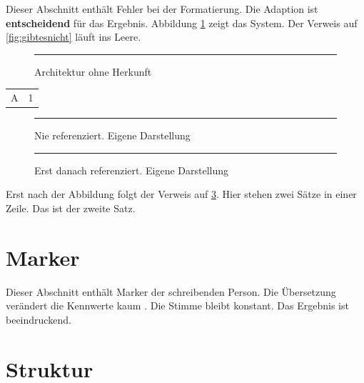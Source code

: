 Dieser Abschnitt enthält Fehler bei der Formatierung.
Die Adaption ist \textbf{entscheidend} für das Ergebnis. %
Abbildung \ref{fig:ohnequelle} zeigt das System. %
Der Verweis auf \cref{fig:gibtesnicht} läuft ins Leere. %

\begin{figure}[htbp] %
    \centering
    \rule{2cm}{1cm}
    \caption{Architektur ohne Herkunft}
    \label{fig:ohnequelle}
\end{figure}

\begin{table}[htbp] %
    \centering
    \begin{tabular}{|l|r|} %
        \hline %
        A & 1 \\
    \end{tabular}
\end{table}

\begin{figure}[htbp] %
    \centering
    \rule{2cm}{1cm}
    \caption{Nie referenziert. Eigene Darstellung}
    \label{fig:nie}
\end{figure}

\begin{figure}[htbp] %
    \centering
    \rule{2cm}{1cm}
    \caption{Erst danach referenziert. Eigene Darstellung}
    \label{fig:spaet}
\end{figure}

Erst nach der Abbildung folgt der Verweis auf \cref{fig:spaet}.
Hier stehen zwei Sätze in einer Zeile. Das ist der zweite Satz. %

\section{Marker}
\label{sec:marker}

Dieser Abschnitt enthält Marker der schreibenden Person.
Die Übersetzung verändert die Kennwerte kaum . %
Die Stimme bleibt konstant.
Das Ergebnis ist beeindruckend. %

\section{Struktur} %
\label{sec:struktur}

